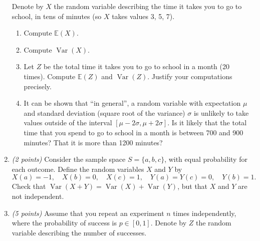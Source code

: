 \documentclass[12pt]{article}
\newcommand{\E}{\mathbb{E}}	%
\DeclareMathOperator{\Var}{Var}  %
\begin{document}
\begin{enumerate}
Denote by \( X \) the random variable describing the time it takes you to go to school, in tens of minutes (so \( X \) takes values 3, 5, 7).

\begin{enumerate}
\item Compute \( \E(X) \). \newline


\item Compute \( \Var(X) \). \newline


\item Let \( Z \) be the total time it takes you to go to school in a month (20 times). Compute \( \E(Z) \) and \( \Var(Z) \). Justify your computations precisely. \newline


\item It can be shown that ``in general'', a random variable with expectation \( \mu \) and standard deviation (square root of the variance) \( \sigma \) is unlikely to take values outside of the interval \( [\mu-2\sigma, \mu+2\sigma] \). Is it likely that the total time that you spend to go to school in a month is between 700 and 900 minutes? That it is more than 1200 minutes? \newline


\end{enumerate}

\item \emph{(2 points)} Consider the sample space \( S = \{ a, b, c \} \), with equal probability for each outcome. Define the random variables \( X \) and \( Y \) by
\[
X(a) = -1, \quad X(b) = 0, \quad X(c) = 1, \quad Y(a) = Y(c) = 0, \quad Y(b) = 1.
\]
Check that \( \Var(X+Y) = \Var(X) + \Var(Y) \), but that \( X \) and \( Y \) are not independent. \newline


\item \emph{(5 points)} Assume that you repeat an experiment \( n \) times independently, where the probability of success is \( p \in [0,1] \). Denote by \( Z \) the random variable describing the number of successes.


\end{enumerate}
\end{document}
